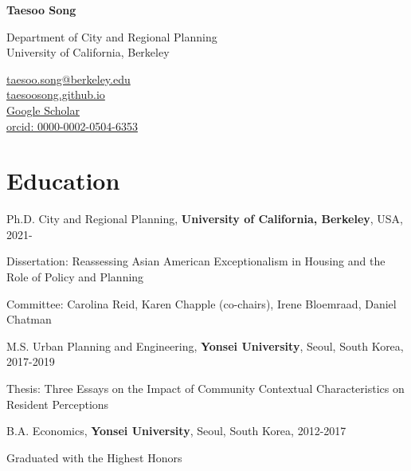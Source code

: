 \documentclass[12pt,letterpaper]{report}
\newcommand{\myname}{Taesoo Song}
\newcommand{\namefont}[1]{{\normalfont\bfseries\Huge{#1}}}
\newcommand{\listitemspace}{0.25em}
\renewenvironment{itemize}
{\begin{list}{}{\setlength{\leftmargin}{0.5em}
                \setlength{\parskip}{0em}
                \setlength{\itemsep}{\listitemspace}
                \setlength{\parsep}{\listitemspace}}}
{\end{list}}
\begin{document}
    \raggedright{}

    \namefont{\myname}

    \vspace{1em}
    \begin{minipage}[t]{0.700\textwidth}
        Department of City and Regional Planning\\
        University of California, Berkeley
    \end{minipage}
    \begin{minipage}[t]{0.295\textwidth}
        \flushright{}
        \href{mailto:taesoo.song@berkeley.edu}{taesoo.song@berkeley.edu} \\
        \href{https://taesoosong.github.io}{taesoosong.github.io}\\
        \href{https://scholar.google.com/citations?user=xM5Rc-EAAAAJ&hl=en}{Google Scholar}\\
        \href{https://orcid.org/0000-0002-0504-6353}{orcid: 0000-0002-0504-6353}
    \end{minipage}

    \section*{Education}
    
    \begin{tablist}
      \item[Ph.D.] \tab{}City and Regional Planning, \textbf{University of California, Berkeley}, USA, 2021-
      \begin{itemize}
        \item Dissertation: Reassessing Asian American Exceptionalism in Housing and the Role of Policy and Planning
        \vspace{-0.25em}
        \item Committee: Carolina Reid, Karen Chapple (co-chairs), Irene Bloemraad, Daniel Chatman
    \end{itemize}
      \item[M.S.] \tab{}Urban Planning and Engineering, \textbf{Yonsei University}, Seoul, South Korea, 2017-2019
      \begin{itemize}
        \item Thesis: Three Essays on the Impact of Community Contextual Characteristics on Resident Perceptions
    \end{itemize}
      \item[B.A.] \tab{}Economics, \textbf{Yonsei University}, Seoul, South Korea, 2012-2017
      \begin{itemize}
        \item Graduated with the Highest Honors
    \end{itemize}
    \end{tablist}
    
\end{document}
